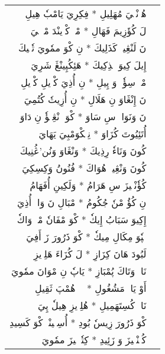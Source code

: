 \documentclass[a4paper, 12pt]{report}
\begin{document}
\begin{longtable}{rl}
\textarabic{هُزٖنْڠٖيَ مُهَلِيلِ  *  فِكِرِيَ يَامْبٗ هِيلِ} & \\ 
\textarabic{لَ كُؤَزِيمَ فَهَالِ  *  مْكٖ كْوٖينْدَ مْپٖكٖيَ} & \\ 
[8mm] 

\textarabic{نَ لَنْڠِينٖ كَذَلِيكَ  *  نِ كْوَ ممٗويَ تٗشٖيكَ} & \\ 
\textarabic{إِيلَ كِيوَ مٖذِكِيكَ  *  هَئِكُپِينْڠَ شَرِيَ} & \\ 
[8mm] 

\textarabic{مْكٖ سِؤٗوٖ وَ پِيلِ  *  نِ أُذِيَ كْوٖيلِ كْوٖيلِ} & \\ 
\textarabic{نَ إِنْڠَاوَ نِ هَلَالِ  *  نِ أُزِيتٗ كُتُمِيَ} & \\ 
[8mm] 

\textarabic{نَ وَنَوَاكٖ سِ سَاوَ  *  كْوَ وٖنْڠِنٖؤٗ نِ دَاوَ} & \\ 
\textarabic{أُتَئِيُوتَ كُزَاوَ  *  نِمٖكْوَمْبِيَ يَهَايَ} & \\ 
[8mm] 

\textarabic{كُونَ وَنَاءٗ رِذِيكَ  *  وَنْڠَاوَ وَنُن’ڠُنِيكَ} & \\ 
\textarabic{كُونَ وَنْڠِينٖ هُوَاكَ  *  فُنُونُ وَكِسِكِيَ} & \\ 
[8mm] 

\textarabic{كُؤٗنْڠٖيزَ سِ هَرَامُ  *  وَلَكِينِ أُفَهَامُ} & \\ 
\textarabic{نِ كُؤُ مْنٗ جُكُومُ  *  مْبَالِ نَ وَاكٖ أُذِيَ} & \\ 
[8mm] 

\textarabic{إِكِيوَ سَبَابُ إِيكٗ  *  كْوَ مْفَانٗ مْكٖ وَاكٗ} & \\ 
\textarabic{مٖپٗوَ مِكَالِ مِيكٗ  *  كْوَ ذَرُورَ زَ أَفِيَ} & \\ 
[8mm] 

\textarabic{لَبُودَ هَانَ كِزَازِ  *  لَ كُزَاءَ هَلِوٖيزِ} & \\ 
\textarabic{نَاوٖ وَتَاكَ پُمْبَازِ  *  يَاپٗ نِ مْوَانَ ممٗويَ} & \\ 
[8mm] 

\textarabic{أَوْ يَالٖ مَشُغُولِ  *  يٖيٖ هُمْپَ ثَقِيلِ} & \\ 
\textarabic{نَاوٖ كُسِتَهَمِيلِ  *  هُلِوٖيزِ هِيلٗ پِيَ} & \\ 
[8mm] 

\textarabic{كْوَ ذَرُورَ زِيسٗ بُودِ  *  أُسِتٖينْدٖ كْوَ كَسِيدِ} & \\ 
\textarabic{كُئٖنْڠٖيزَ وَ زَئِيدِ  *  كِتٗشٖلٖيزَ ممٗويَ} & \\ 
[8mm] 


\end{longtable}
\end{document}
